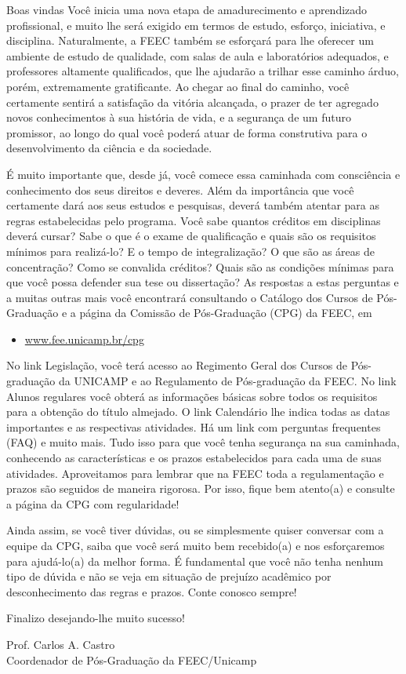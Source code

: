 \begin{story}{Boas vindas}
Você inicia uma nova etapa de amadurecimento e aprendizado profissional, e muito lhe será exigido em termos de estudo, esforço, iniciativa, e disciplina. Naturalmente, a FEEC também se esforçará para lhe oferecer um ambiente de estudo de qualidade, com salas de aula e laboratórios adequados, e professores altamente qualificados, que lhe ajudarão a trilhar esse caminho árduo, porém, extremamente gratificante. Ao chegar ao final do caminho, você certamente sentirá a satisfação da vitória alcançada, o prazer de ter agregado novos conhecimentos à sua história de vida, e a segurança de um futuro promissor, ao longo do qual você poderá atuar de forma construtiva para o desenvolvimento da ciência e da sociedade.

É muito importante que, desde já, você comece essa caminhada com consciência e conhecimento dos seus direitos e deveres. Além da importância que você certamente dará aos seus estudos e pesquisas, deverá também atentar para as regras estabelecidas pelo programa. Você sabe quantos créditos em disciplinas deverá cursar? Sabe o que é o exame de qualificação e quais são os requisitos mínimos para realizá-lo? E o tempo de integralização? O que são as áreas de concentração? Como se convalida créditos? Quais são as condições mínimas para que você possa defender sua tese ou dissertação? As respostas a estas perguntas e a muitas outras mais você encontrará consultando o Catálogo dos Cursos de Pós-Graduação e a página da Comissão de Pós-Graduação (CPG) da FEEC, em

\begin{itemize}
\item \url{www.fee.unicamp.br/cpg}
\end{itemize}

No link Legislação, você terá acesso ao Regimento Geral dos Cursos de Pós-graduação da UNICAMP e ao Regulamento de Pós-graduação da FEEC. No link Alunos regulares você obterá as informações básicas sobre todos os requisitos para a obtenção do título almejado. O link Calendário lhe indica todas as datas importantes e as respectivas atividades. Há um link com perguntas frequentes (FAQ) e muito mais. Tudo isso para que você tenha segurança na sua caminhada, conhecendo as características e os prazos estabelecidos para cada uma de suas atividades. Aproveitamos para lembrar que na FEEC toda a regulamentação e prazos são seguidos de maneira rigorosa. Por isso, fique bem atento(a) e consulte a página da CPG com regularidade!

Ainda assim, se você tiver dúvidas, ou se simplesmente quiser conversar com a equipe da CPG, saiba que você será muito bem recebido(a) e nos esforçaremos para ajudá-lo(a) da melhor forma. É fundamental que você não tenha nenhum tipo de dúvida e não se veja em situação de prejuízo acadêmico por desconhecimento das regras e prazos. Conte conosco sempre!

Finalizo desejando-lhe muito sucesso!

\begin{flushright}
Prof. Carlos A. Castro \\
Coordenador de Pós-Graduação da FEEC/Unicamp
\end{flushright}

\end{story}

